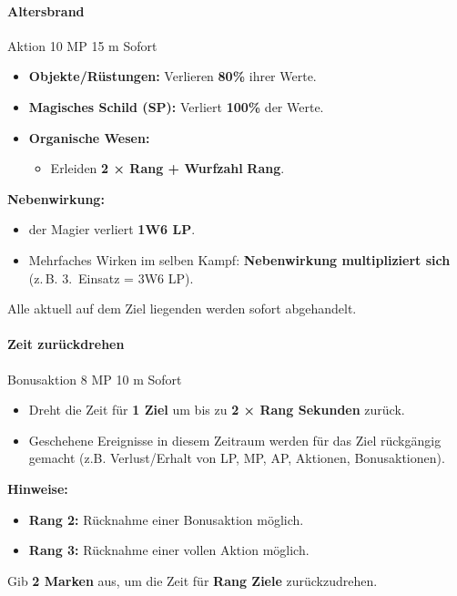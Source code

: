 \paragraph*{Altersbrand}

\spellcard
{}
{Aktion}
{10 MP}
{15 m}
{Sofort}
{
	\begin{itemize}
		\item \textbf{Objekte/Rüstungen:} Verlieren \textbf{80\%} ihrer Werte.
		\item \textbf{Magisches Schild (SP):} Verliert \textbf{100\%} der Werte.
		\item \textbf{Organische Wesen:}
		\begin{itemize}
			\item Erleiden \textbf{2 × Rang + Wurfzahl} 
			\textbf{Rang}.
		\end{itemize}
	\end{itemize}
	
	\medskip
	\textbf{Nebenwirkung:}
	\begin{itemize}
		\item der Magier verliert \textbf{1W6 LP}.
		\item Mehrfaches Wirken im selben Kampf:
		\textbf{Nebenwirkung multipliziert sich}
		(z.\,B. 3.\ Einsatz = 3W6 LP).
	\end{itemize}
}
{
	Alle aktuell auf dem Ziel liegenden 
	werden sofort abgehandelt.
}

\paragraph*{Zeit zurückdrehen}

\spellcard
{}
{Bonusaktion}
{8 MP}
{10 m}
{Sofort}
{
	\begin{itemize}
		\item Dreht die Zeit für \textbf{1 Ziel} um bis zu
		\textbf{2 × Rang Sekunden} zurück.
		\item Geschehene Ereignisse in diesem Zeitraum werden für das Ziel rückgängig gemacht (z.B. Verlust/Erhalt von LP, MP, AP, Aktionen, Bonusaktionen).
	\end{itemize}
	
	\medskip
	\textbf{Hinweise:}
	\begin{itemize}
		\item \textbf{Rang 2:} Rücknahme einer Bonusaktion möglich.
		\item \textbf{Rang 3:} Rücknahme einer vollen Aktion möglich.
	\end{itemize}
}
{
	Gib \textbf{2 Marken} aus, um die Zeit für
	\textbf{Rang Ziele} zurückzudrehen.
}


